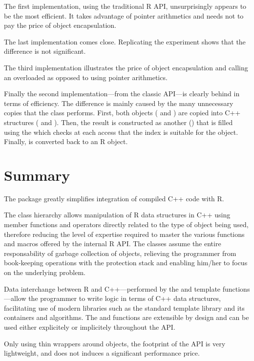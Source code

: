 The first implementation, using the traditional R API, unsurprisingly 
appears to be the most efficient. It takes advantage of pointer 
arithmetics and needs not to pay the price of object encapsulation. 

The last implementation comes close. Replicating the experiment
shows that the difference is not significant. 

The third implementation illustrates the price of object encapsulation
and calling an overloaded  as opposed to using 
pointer arithmetics.

Finally the second implementation---from the classic  API---is
clearly behind in terms of efficiency. The difference is mainly 
caused by the many unnecessary copies that the 
class performs. First, both objects ( and )
are copied into C++ structures ( and ). 
Then, the result is constructed as another 
() that is filled using the  which checks
at each access that the index is suitable for the object. Finally, 
is converted back to an R object. 

\section{Summary}

The  package greatly simplifies integration of compiled C++ code
with R. 

The class hierarchy allows manipulation of R data structures in C++ 
using member functions and operators directly related to the type
of object being used, therefore reducing the level of expertise
required to master the various functions and macros offered by the
internal R API. The classes assume the entire 
responsability of garbage collection of objects, relieving the 
programmer from book-keeping operations with the protection stack 
and enabling him/her to focus on the underlying problem. 

Data interchange between R and C++---performed by the 
 and  template functions---allow the programmer
to write logic in terms of C++ data structures, facilitating use
of modern libraries such as the standard template library and its 
containers and algorithms. The  and  functions are extensible
by design and can be used either explicitely or implicitely throughout 
the API. 

Only using thin wrappers around  objects, 
the footprint of the  API is very lightweight, and does not 
induces a significant performance price. 

